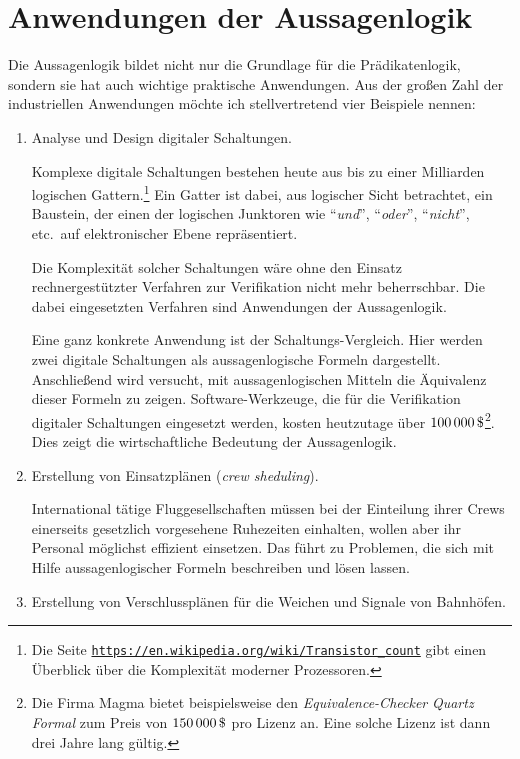 \section{Anwendungen der Aussagenlogik}
Die Aussagenlogik bildet nicht nur die Grundlage f\"{u}r die Pr\"{a}dikatenlogik, sondern sie hat auch wichtige praktische
Anwendungen.  Aus der gro\ss{}en Zahl der industriellen Anwendungen m\"{o}chte ich stellvertretend vier Beispiele nennen:
\begin{enumerate}
\item Analyse und Design digitaler Schaltungen.

      Komplexe digitale Schaltungen bestehen heute aus bis zu einer Milliarden logischen
      Gattern.\footnote{Die Seite 
      \href{https://en.wikipedia.org/wiki/Transistor_count}{\texttt{https://en.wikipedia.org/wiki/Transistor\_count}}
      gibt einen \"{U}berblick \"{u}ber die Komplexit\"{a}t moderner Prozessoren.}
      Ein Gatter ist dabei, aus logischer Sicht betrachtet, ein Baustein, der einen
      der logischen Junktoren wie ``\textsl{und}'', ``\textsl{oder}'', ``\textsl{nicht}'',
      etc.~auf elektronischer Ebene repr\"{a}sentiert. 
  
      Die Komplexit\"{a}t solcher Schaltungen w\"{a}re ohne den Einsatz
      rechnergest\"{u}tzter Verfahren zur Verifikation nicht mehr beherrschbar.  Die
      dabei eingesetzten Verfahren sind Anwendungen der Aussagenlogik. 

      Eine ganz konkrete Anwendung ist der Schaltungs-Vergleich.  Hier werden zwei
      digitale Schaltungen als aussagenlogische Formeln dargestellt.
      Anschlie\ss{}end wird versucht, mit aussagenlogischen Mitteln die \"{A}quivalenz dieser
      Formeln zu zeigen. Software-Werkzeuge, die f\"{u}r die Verifikation digitaler
      Schaltungen eingesetzt werden, kosten heutzutage \"{u}ber $100\,000\,\symbol{36}$\footnote{
        Die Firma Magma bietet beispielsweise den \emph{Equivalence-Checker}
        \textsl{Quartz Formal} zum Preis von $150\,000\, \symbol{36}$ pro Lizenz an.
      Eine solche Lizenz ist dann drei Jahre lang g\"{u}ltig.}.
      Dies zeigt die wirtschaftliche Bedeutung der Aussagenlogik.

\item Erstellung von Einsatzpl\"{a}nen (\emph{crew sheduling}).

      International t\"{a}tige Fluggesellschaften m\"{u}ssen bei der Einteilung ihrer Crews
      einerseits gesetzlich vorgesehene Ruhezeiten einhalten, wollen aber ihr Personal
      m\"{o}glichst effizient einsetzen.  Das f\"{u}hrt zu Problemen, die sich mit Hilfe
      aussagenlogischer Formeln beschreiben und l\"{o}sen lassen.
\item Erstellung von Verschlusspl\"{a}nen f\"{u}r die Weichen und Signale von Bahnh\"{o}fen.


\end{enumerate}

